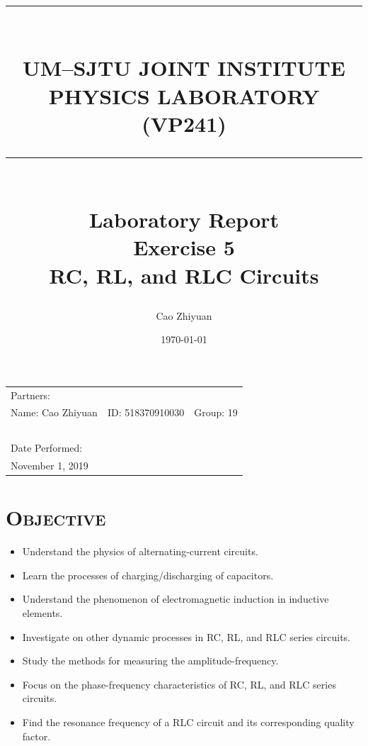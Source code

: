 \documentclass[a4paper,12pt]{article}
\title{\rule{\textwidth}{0.3mm} \\UM–SJTU JOINT INSTITUTE \\ PHYSICS LABORATORY \\ (VP241) \\ \rule{\textwidth}{0.3mm} \\ [30 mm]  \Large{Laboratory Report} \\[5 mm]  Exercise 5 \\[1 mm] 
RC, RL, and RLC Circuits \\[20 mm]} %
\author{Cao Zhiyuan} %
\date{\today} %
\begin{document}
\scshape

\maketitle %

\begin{center}
\begin{tabular}{l l l}
\\[5 mm]
Partners:  \\
Name: Cao Zhiyuan & ID: 518370910030 & Group: 19 \\
~\\
Date Performed:\\
November 1, 2019\\
\end{tabular}
\end{center}

\thispagestyle{empty}


\newpage


\small\tableofcontents
\thispagestyle{empty}


\newpage

\setcounter{page}{1}
\upshape
\section{\textsc{Objective}}
\begin{itemize}
\item Understand the physics of alternating-current circuits.
\item Learn the processes of charging/discharging of capacitors.
\item Understand the phenomenon of electromagnetic induction in inductive elements.
\item Investigate on other dynamic processes in RC, RL, and RLC series circuits.
\item Study the methods for measuring the amplitude-frequency.
\item Focus on the phase-frequency characteristics of RC, RL, and RLC series circuits.
\item Find the resonance frequency of a RLC circuit and its corresponding quality factor.
\end{itemize}

\end{document}

